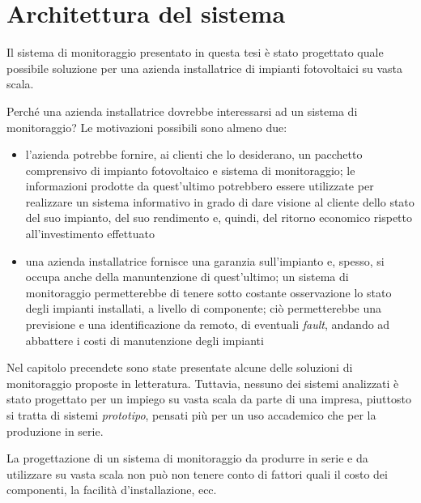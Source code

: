 \clearpage{\pagestyle{empty}\cleardoublepage}
\chapter{Architettura del sistema}
%
Il sistema di monitoraggio presentato in questa tesi \`e stato progettato 
quale possibile soluzione per una azienda installatrice di impianti fotovoltaici 
su vasta scala.
%

%
Perch\'e una azienda installatrice dovrebbe interessarsi ad un sistema 
di monitoraggio? Le motivazioni possibili sono almeno due:
%
\begin{itemize}
\item l'azienda potrebbe fornire, ai clienti che lo desiderano, un pacchetto 
      comprensivo di impianto fotovoltaico e sistema di monitoraggio; le 
      informazioni prodotte da quest'ultimo potrebbero essere utilizzate 
      per realizzare un sistema informativo in grado di dare visione 
      al cliente  dello stato del suo impianto,  del 
      suo rendimento e, quindi,  del ritorno economico 
      rispetto all'investimento effettuato
%
\item una azienda installatrice fornisce una garanzia sull'impianto e, spesso, 
      si occupa anche della manuntenzione di quest'ultimo; un sistema di 
      monitoraggio permetterebbe di tenere sotto costante osservazione 
      lo stato degli impianti installati, a livello di componente; ci\`o
      permetterebbe una previsione e una identificazione da remoto, di 
      eventuali \emph{fault}, andando ad abbattere i costi di manutenzione
      degli impianti
\end{itemize}
%

%
Nel capitolo precendete sono state presentate alcune delle soluzioni di 
monitoraggio proposte in letteratura. Tuttavia, nessuno dei sistemi analizzati 
\`e stato progettato per un impiego su vasta scala da parte di una impresa, 
piuttosto si tratta di sistemi \emph{prototipo}, pensati pi\`u per un uso 
accademico che per la produzione in serie.
%

La progettazione di un sistema di monitoraggio da produrre in serie e da utilizzare su 
vasta scala non pu\`o non tenere conto di fattori quali il costo dei 
componenti, la facilit\`a d'installazione, ecc.
%

